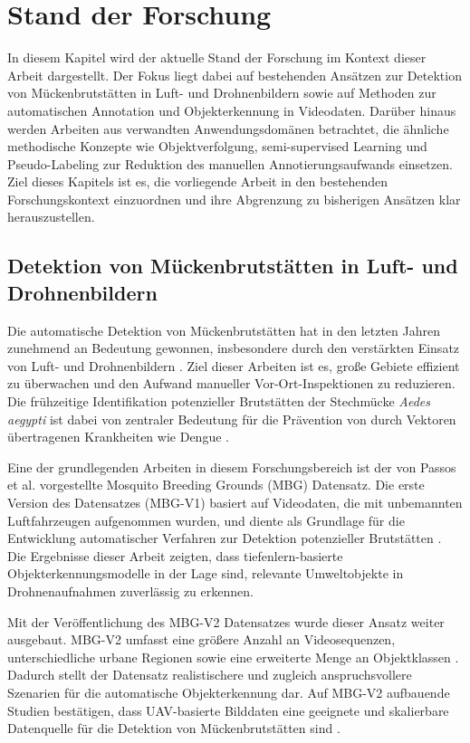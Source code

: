 \section{Stand der Forschung}

In diesem Kapitel wird der aktuelle Stand der Forschung im Kontext dieser Arbeit dargestellt. Der Fokus liegt dabei auf bestehenden Ansätzen zur Detektion von Mückenbrutstätten in Luft- und Drohnenbildern sowie auf Methoden zur automatischen Annotation und Objekterkennung in Videodaten. Darüber hinaus werden Arbeiten aus verwandten Anwendungsdomänen betrachtet, die ähnliche methodische Konzepte wie Objektverfolgung, semi-supervised Learning und Pseudo-Labeling zur Reduktion des manuellen Annotierungsaufwands einsetzen. Ziel dieses Kapitels ist es, die vorliegende Arbeit in den bestehenden Forschungskontext einzuordnen und ihre Abgrenzung zu bisherigen Ansätzen klar herauszustellen.



\subsection{Detektion von Mückenbrutstätten in Luft- und Drohnenbildern}

Die automatische Detektion von Mückenbrutstätten hat in den letzten Jahren zunehmend an 
Bedeutung gewonnen, insbesondere durch den verstärkten Einsatz von Luft- und 
Drohnenbildern \cite{mahfodz2019review}. Ziel dieser Arbeiten ist es, große Gebiete effizient zu überwachen und den Aufwand manueller Vor-Ort-Inspektionen zu reduzieren. Die frühzeitige Identifikation potenzieller Brutstätten der Stechmücke \textit{Aedes aegypti} ist dabei von zentraler Bedeutung für die Prävention von durch Vektoren übertragenen Krankheiten wie Dengue \cite{knoblauch2023breeding}.

Eine der grundlegenden Arbeiten in diesem Forschungsbereich ist der von Passos et al. 
vorgestellte Mosquito Breeding Grounds (MBG) Datensatz. Die erste Version des Datensatzes (MBG-V1) basiert auf Videodaten, die mit unbemannten Luftfahrzeugen aufgenommen wurden, und diente als Grundlage für die Entwicklung automatischer Verfahren zur Detektion potenzieller Brutstätten \cite{passos2020mbgv1}. Die Ergebnisse dieser Arbeit zeigten, dass tiefenlern-basierte Objekterkennungsmodelle in der Lage sind, relevante Umweltobjekte in Drohnenaufnahmen zuverlässig zu erkennen.

Mit der Veröffentlichung des MBG-V2 Datensatzes wurde dieser Ansatz weiter ausgebaut. 
MBG-V2 umfasst eine größere Anzahl an Videosequenzen, unterschiedliche urbane Regionen 
sowie eine erweiterte Menge an Objektklassen \cite{passos2024mbgv2}. Dadurch stellt der 
Datensatz realistischere und zugleich anspruchsvollere Szenarien für die automatische 
Objekterkennung dar. Auf MBG-V2 aufbauende Studien bestätigen, dass UAV-basierte Bilddaten eine geeignete und skalierbare Datenquelle für die Detektion von Mückenbrutstätten sind \cite{passos2023augmented}.

